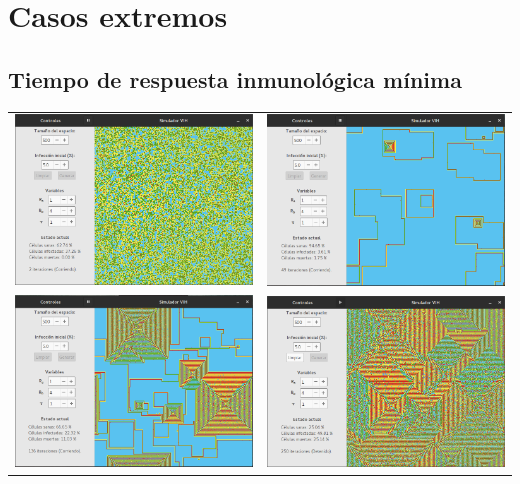 \documentclass[12pt,letterpaper,oneside]{report}
\begin{document}
	\section{Casos extremos} %
	\label{sec:casos_extremos_3}
	\subsection{Tiempo de respuesta inmunológica mínima} %
	\label{sub:tiempo_de_respuesta_inmunol_gica_m_nima}
	\begin{center}
		\begin{tabular}{c c}
		\includegraphics[width=8cm]{img/tiempo/min/1.png} & \includegraphics[width=8cm]{img/tiempo/min/2.png} \\
		\includegraphics[width=8cm]{img/tiempo/min/3.png} & \includegraphics[width=8cm]{img/tiempo/min/4.png} \\
		\end{tabular}
	\end{center}
\end{document}
